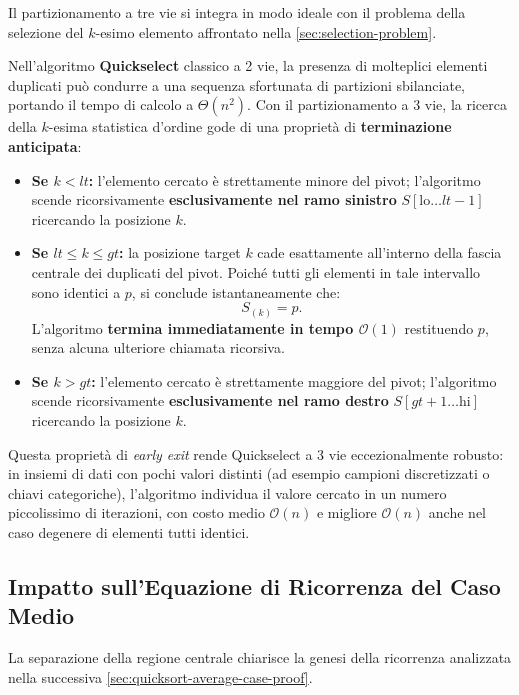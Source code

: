 Il partizionamento a tre vie si integra in modo ideale con il problema della selezione del $k$-esimo elemento affrontato nella \autoref{sec:selection-problem}. 

Nell'algoritmo \textbf{Quickselect} classico a 2 vie, la presenza di molteplici elementi duplicati può condurre a una sequenza sfortunata di partizioni sbilanciate, portando il tempo di calcolo a $\Theta(n^2)$. Con il partizionamento a 3 vie, la ricerca della $k$-esima statistica d'ordine gode di una proprietà di \textbf{terminazione anticipata}:

\begin{itemize}
  \item \textbf{Se $k < lt$:} l'elemento cercato è strettamente minore del pivot; l'algoritmo scende ricorsivamente \textbf{esclusivamente nel ramo sinistro} $S[\text{lo} \dots lt - 1]$ ricercando la posizione $k$.
  \item \textbf{Se $lt \le k \le gt$:} la posizione target $k$ cade esattamente all'interno della fascia centrale dei duplicati del pivot. Poiché tutti gli elementi in tale intervallo sono identici a $p$, si conclude istantaneamente che:
  \begin{equation}
    S_{(k)} = p.
  \end{equation}
  L'algoritmo \textbf{termina immediatamente in tempo $\mathcal{O}(1)$} restituendo $p$, senza alcuna ulteriore chiamata ricorsiva.
  \item \textbf{Se $k > gt$:} l'elemento cercato è strettamente maggiore del pivot; l'algoritmo scende ricorsivamente \textbf{esclusivamente nel ramo destro} $S[gt + 1 \dots \text{hi}]$ ricercando la posizione $k$.
\end{itemize}

Questa proprietà di \textit{early exit} rende Quickselect a 3 vie eccezionalmente robusto: in insiemi di dati con pochi valori distinti (ad esempio campioni discretizzati o chiavi categoriche), l'algoritmo individua il valore cercato in un numero piccolissimo di iterazioni, con costo medio $\mathcal{O}(n)$ e migliore $\mathcal{O}(n)$ anche nel caso degenere di elementi tutti identici.
\FloatBarrier

\subsection{Impatto sull'Equazione di Ricorrenza del Caso Medio}
\label{subsec:3way-average-case-impact}

La separazione della regione centrale chiarisce la genesi della ricorrenza analizzata nella successiva \autoref{sec:quicksort-average-case-proof}. 

